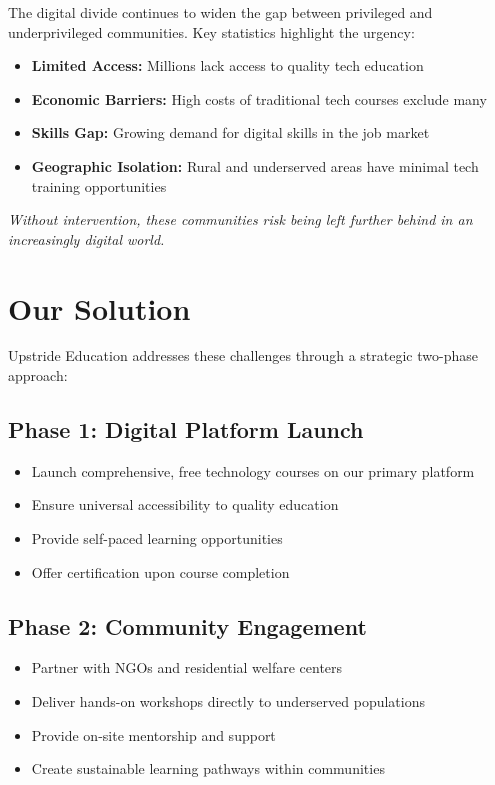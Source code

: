 \documentclass[12pt,a4paper]{article}
\begin{document}
The digital divide continues to widen the gap between privileged and underprivileged communities. Key statistics highlight the urgency:

\begin{itemize}[leftmargin=*]
    \item \textbf{Limited Access:} Millions lack access to quality tech education
    \item \textbf{Economic Barriers:} High costs of traditional tech courses exclude many
    \item \textbf{Skills Gap:} Growing demand for digital skills in the job market
    \item \textbf{Geographic Isolation:} Rural and underserved areas have minimal tech training opportunities
\end{itemize}

\textcolor{upstridegray}{\textit{Without intervention, these communities risk being left further behind in an increasingly digital world.}}

\section{Our Solution}

Upstride Education addresses these challenges through a strategic two-phase approach:

\subsection{Phase 1: Digital Platform Launch}
\begin{itemize}[leftmargin=*]
    \item Launch comprehensive, free technology courses on our primary platform
    \item Ensure universal accessibility to quality education
    \item Provide self-paced learning opportunities
    \item Offer certification upon course completion
\end{itemize}

\subsection{Phase 2: Community Engagement}
\begin{itemize}[leftmargin=*]
    \item Partner with NGOs and residential welfare centers
    \item Deliver hands-on workshops directly to underserved populations
    \item Provide on-site mentorship and support
    \item Create sustainable learning pathways within communities
\end{itemize}
\end{document}

